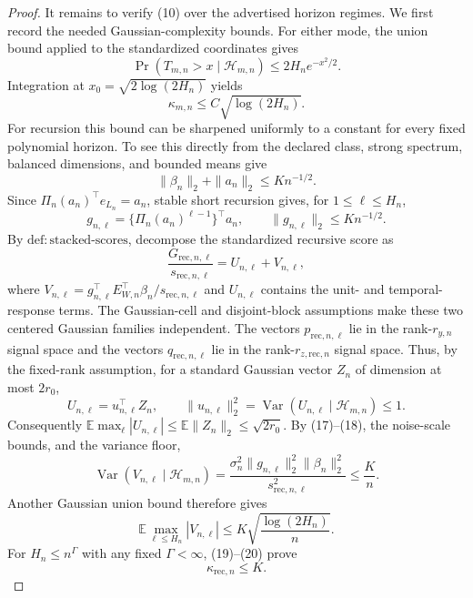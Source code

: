 \documentclass{article}
\begin{document}
\begin{proof}
It remains to verify (10) over the advertised horizon regimes.  We first record the needed Gaussian-complexity bounds.  For either mode, the union bound applied to the standardized coordinates gives
\[
 \Pr(T_{m,n}>x\mid\mathcal H_{m,n})\le2H_ne^{-x^2/2}.
\]
Integration at \(x_0=\sqrt{2\log(2H_n)}\) yields
\[
 \kappa_{m,n}\le C\sqrt{\log(2H_n)}.                               \tag{16}
\]
For recursion this bound can be sharpened uniformly to a constant for every fixed polynomial horizon.  To see this directly from the declared class, strong spectrum, balanced dimensions, and bounded means give
\[
 \|\beta_n\|_2+\|a_n\|_2\le K n^{-1/2}.                            \tag{17}
\]
Since \(\Pi_n(a_n)^{\top}e_{L_n}=a_n\), stable short recursion gives, for \(1\le\ell\le H_n\),
\[
 g_{n,\ell}=\{\Pi_n(a_n)^{\ell-1}\}^{\top}a_n,
 \qquad \|g_{n,\ell}\|_2\le K n^{-1/2}.                           \tag{18}
\]
By \(\mathrm{def{:}stacked\mbox{-}scores}\), decompose the standardized recursive score as
\[
 \frac{G_{\mathrm{rec},n,\ell}}{s_{\mathrm{rec},n,\ell}}
 =U_{n,\ell}+V_{n,\ell},
\]
where \(V_{n,\ell}=g_{n,\ell}^{\top}E_{W,n}^{\top}\beta_n/s_{\mathrm{rec},n,\ell}\) and \(U_{n,\ell}\) contains the unit- and temporal-response terms.  The Gaussian-cell and disjoint-block assumptions make these two centered Gaussian families independent.  The vectors \(p_{\mathrm{rec},n,\ell}\) lie in the rank-\(r_{y,n}\) signal space and the vectors \(q_{\mathrm{rec},n,\ell}\) lie in the rank-\(r_{z,\mathrm{rec},n}\) signal space.  Thus, by the fixed-rank assumption, for a standard Gaussian vector \(Z_n\) of dimension at most \(2r_0\),
\[
 U_{n,\ell}=u_{n,\ell}^{\top}Z_n,
 \qquad \|u_{n,\ell}\|_2^2=\operatorname{Var}(U_{n,\ell}\mid\mathcal H_{m,n})\le1. \tag{19}
\]
Consequently \(\mathbb E\max_\ell|U_{n,\ell}|\le\mathbb E\|Z_n\|_2\le\sqrt{2r_0}\).  By (17)--(18), the noise-scale bounds, and the variance floor,
\[
 \operatorname{Var}(V_{n,\ell}\mid\mathcal H_{m,n})
 =\frac{\sigma_n^2\|g_{n,\ell}\|_2^2\|\beta_n\|_2^2}
 {s_{\mathrm{rec},n,\ell}^2}
 \le \frac K n.                                                     \tag{20}
\]
Another Gaussian union bound therefore gives
\[
 \mathbb E\max_{\ell\le H_n}|V_{n,\ell}|
 \le K\sqrt{\frac{\log(2H_n)}n}.
\]
For \(H_n\le n^\Gamma\) with any fixed \(\Gamma<\infty\), (19)--(20) prove
\[
 \kappa_{\mathrm{rec},n}\le K.                                     \tag{21}
\]


\end{proof}
\end{document}
